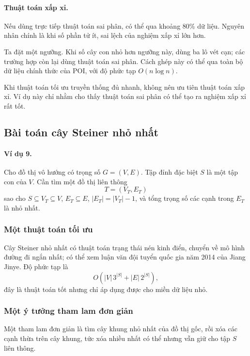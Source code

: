 \documentclass[11pt]{article}
\begin{document}
\paragraph{Thuật toán xấp xỉ.}
Nếu dùng trực tiếp thuật toán sai phân, có thể qua khoảng 80\% dữ liệu. Nguyên
nhân chính là khi số phần tử ít, sai lệch của nghiệm xấp xỉ lớn hơn.

Ta đặt một ngưỡng. Khi số cây con nhỏ hơn ngưỡng này, dùng ba lô vét cạn; các
trường hợp còn lại dùng thuật toán sai phân. Cách ghép này có thể qua toàn bộ
dữ liệu chính thức của POI, với độ phức tạp \(O(n\log n)\).

Khi thuật toán tối ưu truyền thống đủ nhanh, không nên ưu tiên thuật toán xấp
xỉ. Ví dụ này chỉ nhằm cho thấy thuật toán sai phân có thể tạo ra nghiệm xấp xỉ
rất tốt.

\subsection{Bài toán cây Steiner nhỏ nhất}

\paragraph{Ví dụ 9.}
Cho đồ thị vô hướng có trọng số \(G=(V,E)\). Tập đỉnh đặc biệt \(S\) là một tập
con của \(V\). Cần tìm một đồ thị liên thông
\[
  T=(V_T,E_T)
\]
sao cho \(S\subseteq V_T\subseteq V\), \(E_T\subseteq E\),
\(|E_T|=|V_T|-1\), và tổng trọng số các cạnh trong \(E_T\) là nhỏ nhất.

\subsubsection{Một thuật toán tối ưu}

Cây Steiner nhỏ nhất có thuật toán trạng thái nén kinh điển, chuyển về mô hình
đường đi ngắn nhất; có thể xem luận văn đội tuyển quốc gia năm 2014 của Jiang
Jinye. Độ phức tạp là
\[
  O(|V|\,3^{|S|}+|E|\,2^{|S|}),
\]
đây là thuật toán tốt nhưng chỉ áp dụng được cho miền dữ liệu nhỏ.

\subsubsection{Một ý tưởng tham lam đơn giản}

Một tham lam đơn giản là tìm cây khung nhỏ nhất của đồ thị gốc, rồi xóa các cạnh
thừa trên cây khung, tức xóa nhiều nhất có thể nhưng vẫn giữ cho tập \(S\) liên
thông.
\end{document}
